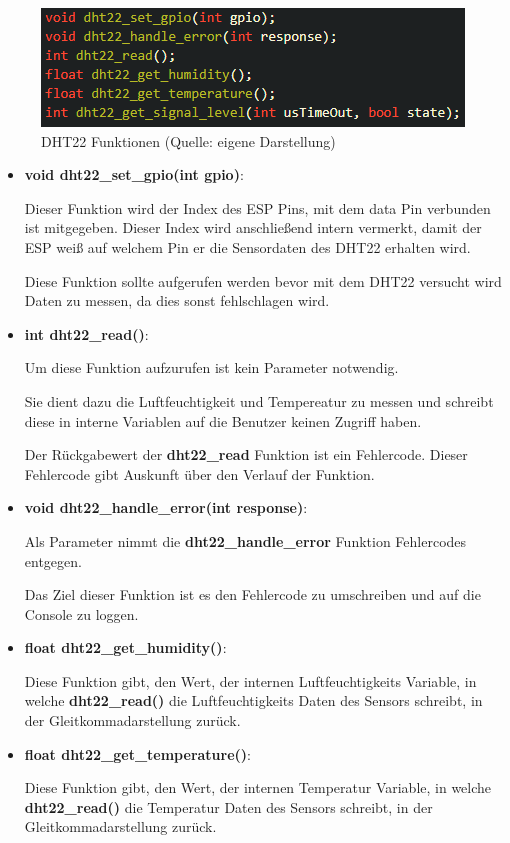 \begin{figure}[H]
    \begin{center}
        \includegraphics[scale=1]{images/dht22_functions.png}
        \caption{DHT22 Funktionen (Quelle: eigene Darstellung)}
        \label{abb:dht22_funcionts}
    \end{center}    
\end{figure}

\begin{itemize}
    \item \textbf{void dht22\_set\_gpio(int gpio)}:

    Dieser Funktion wird der Index des ESP Pins, mit dem data Pin verbunden ist mitgegeben. Dieser Index wird anschließend intern vermerkt, damit der ESP weiß auf welchem Pin er die Sensordaten des DHT22 erhalten wird.
    
    Diese Funktion sollte aufgerufen werden bevor mit dem DHT22 versucht wird Daten zu messen, da dies sonst fehlschlagen wird.
    \item \textbf{int dht22\_read()}:

    Um diese Funktion aufzurufen ist kein Parameter notwendig.

    Sie dient dazu die Luftfeuchtigkeit und Tempereatur zu messen und schreibt diese in interne Variablen auf die Benutzer keinen Zugriff haben.

    Der Rückgabewert der \textbf{dht22\_read} Funktion ist ein Fehlercode. Dieser Fehlercode gibt Auskunft über den Verlauf der Funktion.
    \item \textbf{void dht22\_handle\_error(int response)}:

    Als Parameter nimmt die \textbf{dht22\_handle\_error} Funktion Fehlercodes entgegen.

    Das Ziel dieser Funktion ist es den Fehlercode zu umschreiben und auf die Console zu loggen.
    \item \textbf{float dht22\_get\_humidity()}:

    Diese Funktion gibt, den Wert, der internen Luftfeuchtigkeits Variable, in welche \textbf{dht22\_read()} die Luftfeuchtigkeits Daten des Sensors schreibt, in der Gleitkommadarstellung zurück.
    \item \textbf{float dht22\_get\_temperature()}:

    Diese Funktion gibt, den Wert, der internen Temperatur Variable, in welche \textbf{dht22\_read()} die Temperatur Daten des Sensors schreibt, in der Gleitkommadarstellung zurück.
\end{itemize}


